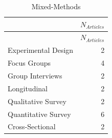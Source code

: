 \documentclass[]{tufte-handout}
\begin{document}
\begin{longtable}[]{@{}lr@{}}
\caption{Mixed-Methods}\tabularnewline
\toprule
& \(N_{Articles}\)\tabularnewline
\midrule
\endfirsthead
\toprule
& \(N_{Articles}\)\tabularnewline
\midrule
\endhead
Experimental Design & 2\tabularnewline
Focus Groups & 4\tabularnewline
Group Interviews & 2\tabularnewline
Longitudinal & 2\tabularnewline
Qualitative Survey & 2\tabularnewline
Quantitative Survey & 6\tabularnewline
Cross-Sectional & 2\tabularnewline
\bottomrule
\end{longtable}
\end{document}

